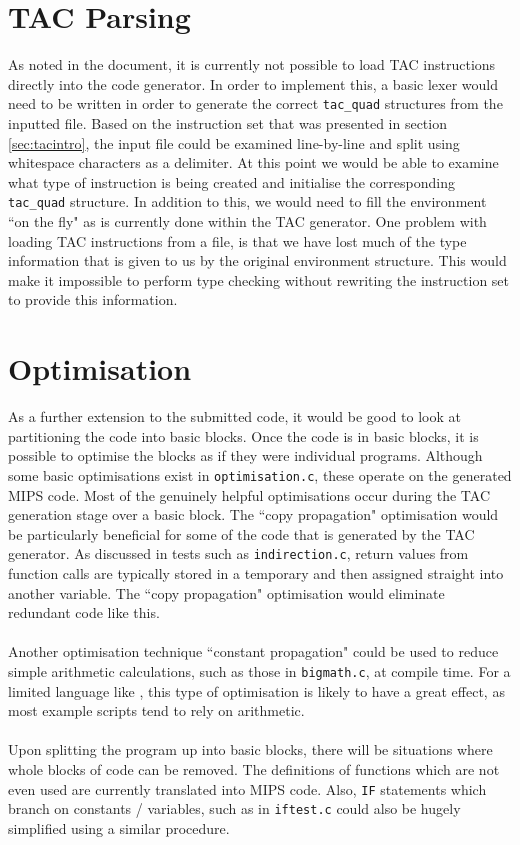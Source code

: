 \section{TAC Parsing}
As noted in the document, it is currently not possible to load TAC instructions directly into the code generator. In order to implement this, a basic lexer would need to be written in order to generate the correct \verb!tac_quad! structures from the inputted file. Based on the instruction set that was presented in section \ref{sec:tacintro}, the input file could be examined line-by-line and split using whitespace characters as a delimiter. At this point we would be able to examine what type of instruction is being created and initialise the corresponding \verb!tac_quad! structure. In addition to this, we would need to fill the environment ``on the fly" as is currently done within the TAC generator. One problem with loading TAC instructions from a file, is that we have lost much of the type information that is given to us by the original environment structure. This would make it impossible to perform type checking without rewriting the instruction set to provide this information.

\section{Optimisation}
As a further extension to the submitted code, it would be good to look at partitioning the code into basic blocks. Once the code is in basic blocks, it is possible to optimise the blocks as if they were individual programs. Although some basic optimisations exist in \verb!optimisation.c!, these operate on the generated MIPS code. Most of the genuinely helpful optimisations occur during the TAC generation stage over a basic block. The ``copy propagation" optimisation would be particularly beneficial for some of the code that is generated by the TAC generator. As discussed in tests such as \verb!indirection.c!, return values from function calls are typically stored in a temporary and then assigned straight into another variable. The ``copy propagation" optimisation would eliminate redundant code like this.
\ \\ \ \\
Another optimisation technique ``constant propagation" could be used to reduce simple arithmetic calculations, such as those in \verb!bigmath.c!, at compile time. For a limited language like \mmc, this type of optimisation is likely to have a great effect, as most example scripts tend to rely on arithmetic.
\ \\ \ \\
Upon splitting the program up into basic blocks, there will be situations where whole blocks of code can be removed. The definitions of functions which are not even used are currently translated into MIPS code. Also, \verb!IF! statements which branch on constants / variables, such as in \verb!iftest.c! could also be hugely simplified using a similar procedure.

